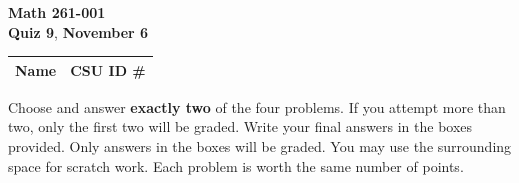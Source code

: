 \documentclass[12pt]{exam}
\newcommand{\class}{Math 261-001}
\newcommand{\examnum}{Quiz 9}
\newcommand{\examdate}{November 6}
\begin{document}
\pagestyle{plain}
\thispagestyle{empty}

\noindent
\textbf{\class}\\
\textbf{\examnum}, \textbf{\examdate}

\setlength{\tabcolsep}{3.5cm}
\renewcommand{\arraystretch}{1.5}
\setlength\extrarowheight{1cm}
\begin{tabular}{ |c|c| }
 \hline
 Name   & CSU ID \#  \\
 \hline
\end{tabular}

\vspace{10pt}

Choose and answer \textbf{exactly two} of the four problems. If you attempt
more than two, only the first two will be graded. Write your final answers
in the boxes provided. Only answers in the boxes will be graded.
You may use the surrounding space for scratch work. Each problem is worth
the same number of points.
\end{document}
